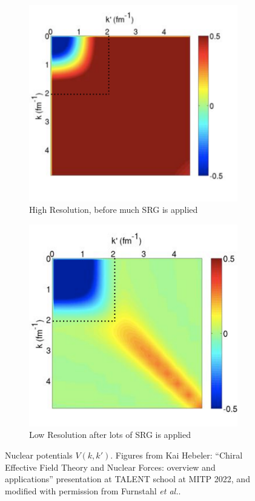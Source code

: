 \documentclass[12pt]{article}
\newcommand{\etal}{\textit{et al.}}
\newcommand{\3}{\ss}
\numberwithin{equation}{section}
\begin{document}
\begin{figure}[H]
  \centering
  \begin{subfigure}{0.45\textwidth}
    \centering
    \includegraphics[width=\linewidth]{HighRes.png}
    \caption{High Resolution, before much SRG is applied}
    \label{fig:highres}
  \end{subfigure}
  \hfill
  \begin{subfigure}{0.45\textwidth}
    \centering
    \includegraphics[width=\linewidth]{LowRes.png}
    \caption{Low Resolution after lots of SRG is applied}
    \label{fig:lowres}
  \end{subfigure}
  \caption{Nuclear potentials $V(k,k')$. Figures from Kai Hebeler:
    ``Chiral Effective Field Theory and Nuclear Forces:
    overview and applications'' presentation at TALENT school at MITP
    2022, and modified with permission from
    Furnstahl \etal \cite{Furnstahl2013}.
  }
  \label{fig:SRGtransform}
\end{figure}
\end{document}
